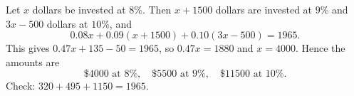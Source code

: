 Let $x$ dollars be invested at $8\%$. Then $x+1500$ dollars are invested at $9\%$ and $3x-500$ dollars at $10\%$, and
\[
0.08x+0.09(x+1500)+0.10(3x-500)=1965 .
\]
This gives $0.47x+135-50=1965$, so $0.47x=1880$ and $x=4000$. Hence the amounts are
\[
\boxed{\$4000\text{ at }8\%,\quad \$5500\text{ at }9\%,\quad \$11500\text{ at }10\%}.
\]
Check: $320+495+1150=1965$.
